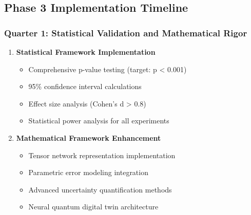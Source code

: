 \documentclass[12pt,a4paper]{article}
\begin{document}
\subsection{Phase 3 Implementation Timeline}

\subsubsection{Quarter 1: Statistical Validation and Mathematical Rigor}
\begin{enumerate}
    \item \textbf{Statistical Framework Implementation}
    \begin{itemize}
        \item Comprehensive p-value testing (target: p < 0.001)
        \item 95\% confidence interval calculations
        \item Effect size analysis (Cohen's d > 0.8)
        \item Statistical power analysis for all experiments
    \end{itemize}
    
    \item \textbf{Mathematical Framework Enhancement}
    \begin{itemize}
        \item Tensor network representation implementation
        \item Parametric error modeling integration
        \item Advanced uncertainty quantification methods
        \item Neural quantum digital twin architecture
    \end{itemize}
\end{enumerate}
\end{document}
